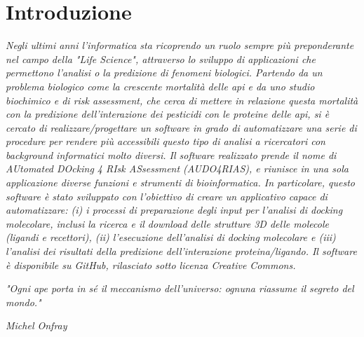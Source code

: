 \chapter*{\centering Introduzione}
\pagestyle{plain}
\begin{adjustwidth}{25pt}{25pt}
\fontsize{18pt}{14pt}\selectfont
\textit{Negli ultimi anni l'informatica sta ricoprendo un ruolo sempre più preponderante nel campo della "Life Science", attraverso lo sviluppo di applicazioni che permettono l’analisi o la predizione di fenomeni biologici. Partendo da un problema biologico come la crescente mortalità delle api e da uno studio biochimico e di risk assessment, che cerca di mettere in relazione questa mortalità con la predizione dell’interazione dei pesticidi con le proteine delle api, si è cercato di realizzare/progettare un software in grado di automatizzare una serie di procedure per rendere più accessibili questo tipo di analisi a ricercatori con background informatici molto diversi. Il software realizzato prende il nome di AUtomated DOcking 4 RIsk ASsessment (AUDO4RIAS), e riunisce in una sola applicazione diverse funzioni e strumenti di bioinformatica. In particolare, questo software è stato sviluppato con l’obiettivo di creare un applicativo capace di automatizzare: (i) i processi di preparazione degli input per l’analisi di docking molecolare, inclusi la ricerca e il download delle strutture 3D delle molecole (ligandi e recettori), (ii) l’esecuzione dell’analisi di docking molecolare e (iii) l’analisi dei risultati della predizione dell’interazione proteina/ligando. Il software è disponibile su GitHub, rilasciato sotto licenza Creative Commons.}
\end{adjustwidth}
\newpage 
{\fontsize{18pt}{14pt}\selectfont
\emph{\newline
\newline
\newline
\newline
\newline
\newline
\newline
\newline
\newline
\newline
\newline
\newline
"Ogni ape porta in sé il meccanismo dell’universo: ognuna riassume il segreto del mondo."}

\begin{flushright}
    \emph{Michel Onfray}
\end{flushright}}